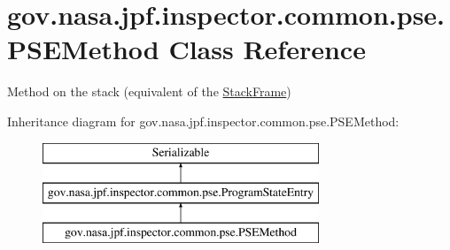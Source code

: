 \hypertarget{classgov_1_1nasa_1_1jpf_1_1inspector_1_1common_1_1pse_1_1_p_s_e_method}{}\section{gov.\+nasa.\+jpf.\+inspector.\+common.\+pse.\+P\+S\+E\+Method Class Reference}
\label{classgov_1_1nasa_1_1jpf_1_1inspector_1_1common_1_1pse_1_1_p_s_e_method}


Method on the stack (equivalent of the \hyperlink{}{Stack\+Frame})  


Inheritance diagram for gov.\+nasa.\+jpf.\+inspector.\+common.\+pse.\+P\+S\+E\+Method\+:\begin{figure}[H]
\begin{center}
\leavevmode
\includegraphics[height=3.000000cm]{classgov_1_1nasa_1_1jpf_1_1inspector_1_1common_1_1pse_1_1_p_s_e_method}
\end{center}
\end{figure}
